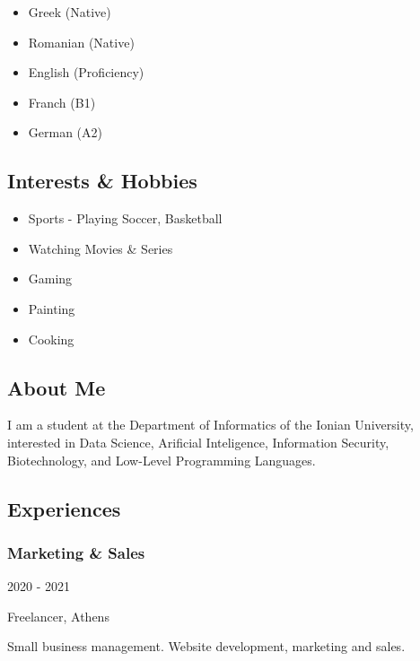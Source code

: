 \documentclass[
  english,
]{article}
\providecommand{\tightlist}{%
  \setlength{\itemsep}{0pt}\setlength{\parskip}{0pt}}
\begin{document}
\begin{itemize}
\tightlist
\item
  Greek {(Native)}
\item
  Romanian {(Native)}
\item
  English {(Proficiency)}
\item
  Franch {(B1)}
\item
  German {(A2)}
\end{itemize}

\hypertarget{interests-hobbies}{%
\subsection{Interests \& Hobbies}\label{interests-hobbies}}

\begin{itemize}
\tightlist
\item
  Sports - Playing Soccer, Basketball
\item
  Watching Movies \& Series
\item
  Gaming
\item
  Painting
\item
  Cooking
\end{itemize}

\hypertarget{about-me}{%
\subsection{\texorpdfstring{{ \emph{} \emph{} } About
Me}{    About Me}}\label{about-me}}

I am a student at the Department of Informatics of the Ionian
University, interested in Data Science, Arificial Inteligence,
Information Security, Biotechnology, and Low-Level Programming
Languages.

\hypertarget{experiences}{%
\subsection{\texorpdfstring{{ \emph{} \emph{} }
Experiences}{    Experiences}}\label{experiences}}

\hypertarget{marketing-sales}{%
\subsubsection{Marketing \& Sales}\label{marketing-sales}}

2020 - 2021

Freelancer, Athens

Small business management. Website development, marketing and sales.
\end{document}
